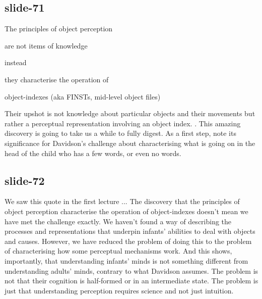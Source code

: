 \documentclass[12pt,\papersize]{extarticle}
\begin{document}
 
\subsection{slide-71}
The principles of object perception

are not items of knowledge

instead

they characterise the operation of

object-indexes (aka FINSTs, mid-level object files)

Their upshot is not knowledge about particular objects and their movements but rather a perceptual representation involving an object index.
\citep{Leslie:1998zk,Scholl:1999mi,Carey:2001ue}.
This amazing discovery is going to take us a while to fully digest. As a first step, note its significance for Davidson's challenge about characterising what is going on in the head of the child who has a few words, or even no words.
 
 
\subsection{slide-72}
We saw this quote in the first lecture ...
The discovery that the principles of object perception characterise the operation of object-indexes doesn't mean we have met the challenge exactly. We haven't found a way of describing the processes and representations that underpin infants' abilities to deal with objects and causes. However, we have reduced the problem of doing this to the problem of characterising how some perceptual mechanisms work. And this shows, importantly, that understanding infants' minds is not something different from understanding adults' minds, contrary to what Davidson assumes. The problem is not that their cognition is half-formed or in an intermediate state. The problem is just that understanding perception requires science and not just intuition.
 
 
\end{document}
